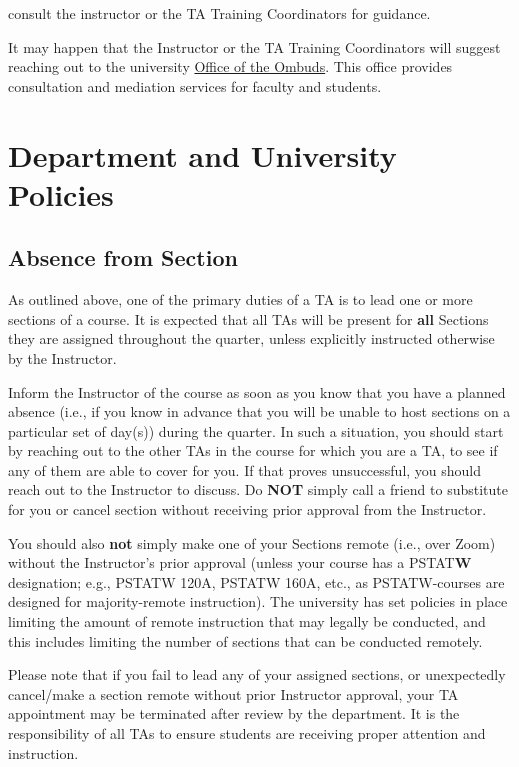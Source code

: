 \documentclass[
  letterpaper,
  DIV=11,
  numbers=noendperiod]{scrreprt}
\begin{document}
consult the instructor or the TA Training Coordinators for guidance.

It may happen that the Instructor or the TA Training Coordinators will
suggest reaching out to the university
\href{ombuds.ucsb.edu/students/services}{Office of the Ombuds}. This
office provides consultation and mediation services for faculty and
students.

\part{\textbf{Department and University Policies}}

\hypertarget{absence-from-section}{%
\chapter{Absence from Section}\label{absence-from-section}}

As outlined above, one of the primary duties of a TA is to lead one or
more sections of a course. It is expected that all TAs will be present
for \textbf{all} Sections they are assigned throughout the quarter,
unless explicitly instructed otherwise by the Instructor.

Inform the Instructor of the course as soon as you know that you have a
planned absence (i.e., if you know in advance that you will be unable to
host sections on a particular set of day(s)) during the quarter. In such
a situation, you should start by reaching out to the other TAs in the
course for which you are a TA, to see if any of them are able to cover
for you. If that proves unsuccessful, you should reach out to the
Instructor to discuss. Do \textbf{NOT} simply call a friend to
substitute for you or cancel section without receiving prior approval
from the Instructor.

You should also \textbf{not} simply make one of your Sections remote
(i.e., over Zoom) without the Instructor's prior approval (unless your
course has a PSTAT\textbf{W} designation; e.g., PSTATW 120A, PSTATW
160A, etc., as PSTATW-courses are designed for majority-remote
instruction). The university has set policies in place limiting the
amount of remote instruction that may legally be conducted, and this
includes limiting the number of sections that can be conducted remotely.

Please note that if you fail to lead any of your assigned sections, or
unexpectedly cancel/make a section remote without prior Instructor
approval, your TA appointment may be terminated after review by the
department. It is the responsibility of all TAs to ensure students are
receiving proper attention and instruction.
\end{document}
